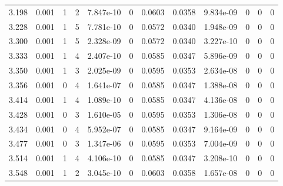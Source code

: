 \documentclass[preview]{standalone}
\begin{document}
{{{\begin{tabular}{L{1.2cm}C{1.2cm} C{0.3cm}C{0.5cm} C{1.4cm}C{1.4cm} C{1.4cm}C{1.4cm} C{1.6cm}C{1.6cm} C{1.6cm}C{1.6cm}}
  3.198  &  0.001  & 1     &  2 &  7.847e-10  & 0  &  0.0603&   0.0358& 9.834e-09 & 0   &  0 & 0  \\ 
  3.228  &  0.001  & 1     &  5 &  7.781e-10  & 0  &  0.0572&   0.0340& 1.948e-09 & 0   &  0 & 0  \\ 
  3.300  &  0.001  & 1     &  5 &  2.328e-09  & 0  &  0.0572&   0.0340& 3.227e-10 & 0   &  0 & 0  \\ 
  3.333  &  0.001  & 1     &  4 &  2.407e-10  & 0  &  0.0585&   0.0347& 5.896e-09 & 0   &  0 & 0  \\ 
  3.350  &  0.001  & 1     &  3 &  2.025e-09  & 0  &  0.0595&   0.0353& 2.634e-08 & 0   &  0 & 0  \\ 
  3.356  &  0.001  & 0     &  4 &  1.641e-07  & 0  &  0.0585&   0.0347& 1.388e-08 & 0   &  0 & 0  \\ 
  3.414  &  0.001  & 1     &  4 &  1.089e-10  & 0  &  0.0585&   0.0347& 4.136e-08 & 0   &  0 & 0  \\ 
  3.428  &  0.001  & 0     &  3 &  1.610e-05  & 0  &  0.0595&   0.0353& 1.306e-08 & 0   &  0 & 0  \\ 
  3.434  &  0.001  & 0     &  4 &  5.952e-07  & 0  &  0.0585&   0.0347& 9.164e-09 & 0   &  0 & 0  \\ 
  3.477  &  0.001  & 0     &  3 &  1.347e-06  & 0  &  0.0595&   0.0353& 7.004e-09 & 0   &  0 & 0  \\ 
  3.514  &  0.001  & 1     &  4 &  4.106e-10  & 0  &  0.0585&   0.0347& 3.208e-10 & 0   &  0 & 0  \\ 
  3.548  &  0.001  & 1     &  2 &  3.045e-10  & 0  &  0.0603&   0.0358& 1.657e-08 & 0   &  0 & 0  \\ 
\hline 
\end{tabular} 

}}}
\end{document}
